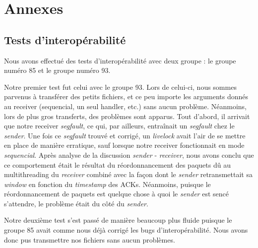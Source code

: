 \documentclass[../main.tex]{subfiles}
\begin{document}
\section{Annexes}
\label{sec:annexes}

\subsection{Tests d'interopérabilité}
\label{sec:interop}

Nous avons effectué des tests d'interopérabilité avec deux groupe : le groupe numéro 85 et le groupe numéro 93. 

Notre premier test fut celui avec le groupe 93. Lors de celui-ci, nous sommes parvenus à transférer des petits fichiers, et ce peu 
importe les arguments donnés au receiver (sequencial, un seul handler, etc.) sans aucun problème. Néanmoins, lors de plus gros transferts, 
des problèmes sont apparus.
Tout d'abord, il arrivait que notre receiver \textit{segfault}, ce qui, par ailleurs, entraînait un \textit{segfault} chez le \textit{sender}.
Une fois ce \textit{segfault} trouvé et corrigé, un \textit{livelock} avait l'air de se mettre en place de manière erratique, sauf lorsque 
notre receiver fonctionnait en mode \textit{sequencial}. Après analyse de la discussion \textit{sender} - \textit{receiver}, nous avons conclu
que ce comportement était le résultat du réordonnancement des paquets dû au multithreading du \textit{receiver} combiné avec la façon dont le 
\textit{sender} retransmettait sa \textit{window} en fonction du \textit{timestamp} des ACKs. Néanmoins, puisque le réordonnancement de paquets 
est quelque chose à quoi le \textit{sender} est sencé s'attendre, le problème était du côté du \textit{sender}.

Notre deuxième test s'est passé de manière beaucoup plus fluide puisque le groupe 85 avait comme nous déjà corrigé les bugs d'interopérabilité.
Nous avons donc pus transmettre nos fichiers sans aucun problèmes.
\end{document}
